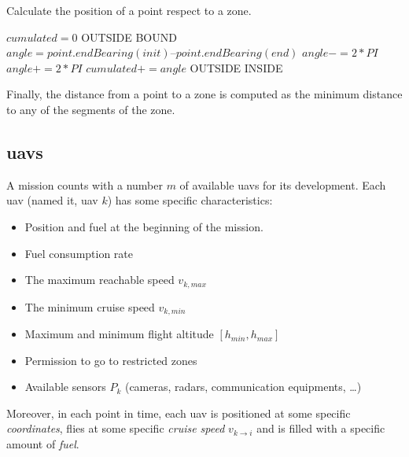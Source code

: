 \begin{algorithm}
\caption{Calculate the position of a point respect to a zone.}
\label{} 
\begin{algorithmic}
\State $cumulated = 0$
			\State \Return OUTSIDE
		\EndIf
		\State \Return BOUND
	\EndIf
	\State $angle = point.endBearing(init) – point.endBearing(end)$
		\State $angle -= 2*PI$
	\Else
			\State $angle += 2*PI$
		\EndIf
	\EndIf
	\State $cumulated += angle$
\EndFor
{}
	\State \Return OUTSIDE
\Else
	\State \Return INSIDE
\EndIf
\end{algorithmic}
\end{algorithm}

Finally, the distance from a point to a zone is computed as the minimum distance to any of the segments of the zone.


\subsection{\glspl{uav}}
A mission counts with a number $m$ of available \glspl{uav} for its development. Each \gls{uav} (named it, \gls{uav} $k$) has some specific characteristics:

\begin{itemize}

\item Position and fuel at the beginning of the mission.
\item Fuel consumption rate
\item The maximum reachable speed $v_{k,max}$ 
\item The minimum cruise speed $v_{k,min}$
\item Maximum and minimum flight altitude $[h_{min},h_{max}]$
\item Permission to go to restricted zones
\item Available sensors $P_k$ (cameras, radars, communication equipments, \ldots)

\end{itemize}

Moreover, in each point in time, each \gls{uav} is positioned at some specific \textit{coordinates}, flies at some specific \textit{cruise speed} $v_{k \to i}$ and is filled with a specific amount of \textit{fuel}.

